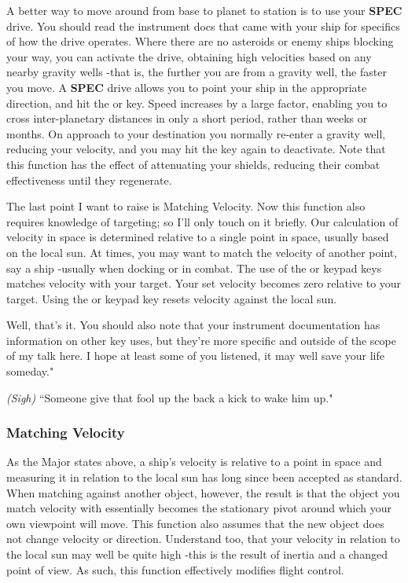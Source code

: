 \documentclass{article}
\newcommand{\key}[1]{%
  \tikz[baseline=(key.base)]{
    \node[draw=gray!50, fill=gray!5, rounded corners=2pt, inner sep=2pt, minimum height=1.5ex] (key) {\footnotesize\sffamily\bfseries #1};
  }%
}
\begin{document}
A better way to move around from base to planet to station is to use your \textbf{SPEC} drive. You should read the instrument docs that came with your ship for specifics of how the drive operates. Where there are no asteroids or enemy ships blocking your way, you can activate the drive, obtaining high velocities based on any nearby gravity wells -that is, the further you are from a gravity well, the faster you move. A \textbf{SPEC} drive allows you to point your ship in the appropriate direction, and hit the \key{a} or \key{A} key. Speed increases by a large factor, enabling you to cross inter-planetary distances in only a short period, rather than weeks or months. On approach to your destination you normally re-enter a gravity well, reducing your velocity, and you may hit the key again to deactivate. Note that this function has the effect of attenuating your shields, reducing their combat effectiveness until they regenerate. 

The last point I want to raise is Matching Velocity. Now this function also requires knowledge of targeting; so I'll only touch on it briefly. Our calculation of velocity in space is determined relative to a single point in space, usually based on the local sun. At times, you may want to match the velocity of another point, say a ship -usually when docking or in combat. The use of the \key{HOME} or keypad \key{KP-7} keys matches velocity with your target. Your set velocity becomes zero relative to your target. Using the \key{END} or keypad \key{KP-1} key resets velocity against the local sun. 

Well, that's it. You should also note that your instrument documentation has information on other key uses, but they're more specific and outside of the scope of my talk here. I hope at least some of you listened, it may well save your life someday." 

\textit{(Sigh) }``Someone give that fool up the back a kick to wake him up." 

\subsubsection{ Matching Velocity }

As the Major states above, a ship's velocity is relative to a point in space and measuring it in relation to the local sun has long since been accepted as standard. When matching against another object, however, the result is that the object you match velocity with essentially becomes the stationary pivot around which your own viewpoint will move. This function also assumes that the new object does not change velocity or direction. Understand too, that your velocity in relation to the local sun may well be quite high -this is the result of inertia and a changed point of view. As such, this function effectively modifies flight control. 
\end{document}
